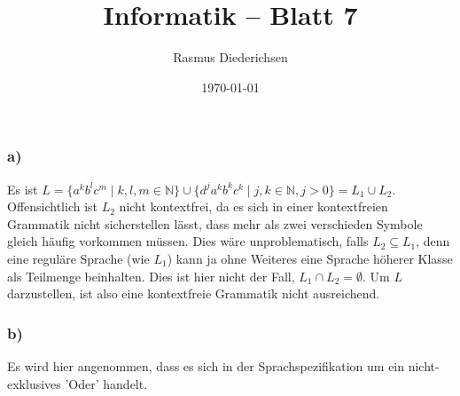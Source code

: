 \documentclass{article}
\title{Informatik \rotatebox[origin=c]{180}{D}\raisebox{2pt}{:} -- Blatt 7}
\author{Rasmus Diederichsen}
\date{\today}
\begin{document}
\maketitle

\section{} 
\subsection{} 
\subsubsection{a)}

Es ist $L = \{a^kb^lc^m \mid k,l,m\in\mathbb{N}\} \cup \{d^ja^kb^kc^k \mid
j,k\in\mathbb{N}, j > 0\} = L_1 \cup L_2$. Offensichtlich ist $L_2$ nicht
kontextfrei, da es sich in einer kontextfreien Grammatik nicht sicherstellen lässt,
dass mehr als zwei verschieden Symbole gleich häufig vorkommen müssen. Dies wäre
unproblematisch, falls $L_2 \subseteq L_1$, denn eine reguläre Sprache (wie
$L_1$) kann ja ohne Weiteres eine Sprache höherer Klasse als Teilmenge
beinhalten. Dies ist hier nicht der Fall, $L_1 \cap L_2 = \emptyset$. Um $L$
darzustellen, ist also eine kontextfreie Grammatik nicht ausreichend.

\subsubsection{b)}

Es wird hier angenommen, dass es sich in der Sprachspezifikation um ein
nicht-exklusives 'Oder' handelt.
\end{document}
